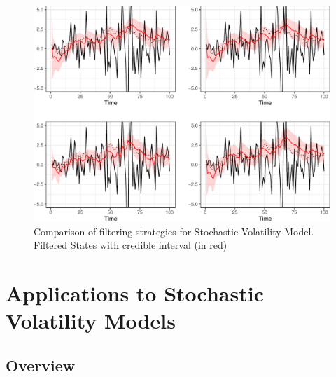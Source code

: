 \documentclass[
]{book}
\theoremstyle{break}
\theoremstyle{nonumberplain}
\begin{document}
\begin{figure}[H]

{\centering \includegraphics{prova_knit_finale_files/figure-latex/unnamed-chunk-35-1} 

}

\caption{Comparison of filtering strategies for Stochastic Volatility Model. Filtered States with credible interval (in red)}\label{fig:unnamed-chunk-35}
\end{figure}

\chapter{Applications to Stochastic Volatility Models}\label{application_chapter}

\section{Overview}
\end{document}
